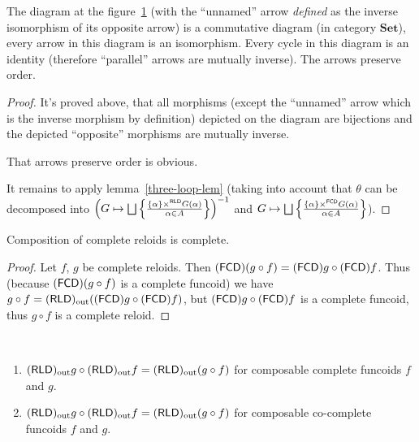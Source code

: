 \begin{thm}
The diagram at the figure~\ref{cmpl-dia} (with the ``unnamed''
arrow \emph{defined} as the inverse isomorphism of its opposite arrow)
is a commutative diagram (in category $\mathbf{Set}$), every arrow
in this diagram is an isomorphism. Every cycle in this diagram is
an identity (therefore ``parallel'' arrows are mutually inverse).
The arrows preserve order.

\begin{figure}[ht]
\caption{\label{cmpl-dia}}


\end{figure}
\end{thm}
\begin{proof}
It's proved above, that all morphisms (except the ``unnamed'' arrow
which is the inverse morphism by definition) depicted on the diagram
are bijections and the depicted ``opposite'' morphisms are mutually
inverse.

That arrows preserve order is obvious.

It remains to apply lemma~\ref{three-loop-lem} (taking into account
that $\theta$ can be decomposed into $\left(G\mapsto\bigsqcup\left\{ \frac{\{\alpha\}\times^{\mathsf{RLD}}G(\alpha)}{\alpha\in A}\right\}\right)^{-1}$
and $G\mapsto\bigsqcup\left\{ \frac{\{\alpha\}\times^{\mathsf{FCD}}G(\alpha)}{\alpha\in A}\right\}$).\end{proof}
\begin{thm}
Composition of complete reloids is complete.\end{thm}
\begin{proof}
Let $f$, $g$ be complete reloids. Then $(\mathsf{FCD})(g\circ f)=(\mathsf{FCD}) g\circ(\mathsf{FCD}) f$.
Thus (because $(\mathsf{FCD})(g\circ f)$ is a complete funcoid) we have $g\circ f=(\mathsf{RLD})_{\mathrm{out}}((\mathsf{FCD}) g\circ(\mathsf{FCD}) f)$,
but $(\mathsf{FCD}) g\circ(\mathsf{FCD}) f$ is a complete funcoid, thus $g\circ f$
is a complete reloid.\end{proof}
\begin{thm}
~
\begin{enumerate}
\item $(\mathsf{RLD})_{\mathrm{out}} g\circ(\mathsf{RLD})_{\mathrm{out}} f=(\mathsf{RLD})_{\mathrm{out}}(g\circ f)$ for composable
complete funcoids $f$ and $g$.
\item $(\mathsf{RLD})_{\mathrm{out}} g\circ(\mathsf{RLD})_{\mathrm{out}} f=(\mathsf{RLD})_{\mathrm{out}}(g\circ f)$ for composable
co-complete funcoids $f$ and $g$.
\end{enumerate}
\end{thm}
